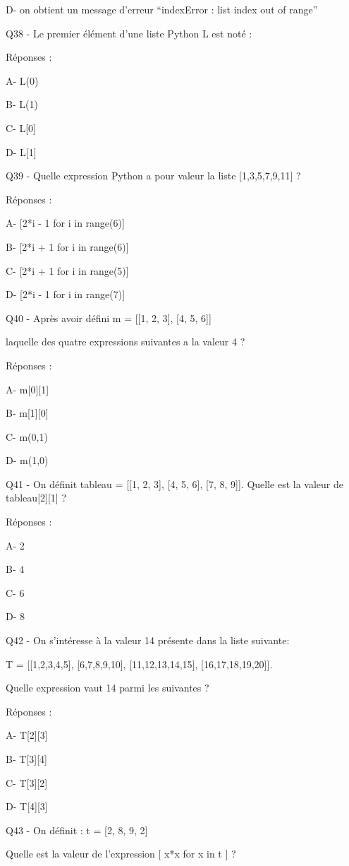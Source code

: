 \documentclass[
]{book}
\begin{document}
D- on obtient un message d'erreur ``indexError : list index out of range''

Q38 - Le premier élément d'une liste Python L est noté :

Réponses :

A- L(0)

B- L(1)

C- L{[}0{]}

D- L{[}1{]}

Q39 - Quelle expression Python a pour valeur la liste {[}1,3,5,7,9,11{]} ?

Réponses :

A- {[}2*i - 1 for i in range(6){]}

B- {[}2*i + 1 for i in range(6){]}

C- {[}2*i + 1 for i in range(5){]}

D- {[}2*i - 1 for i in range(7){]}

Q40 - Après avoir défini m = {[}{[}1, 2, 3{]}, {[}4, 5, 6{]}{]}

laquelle des quatre expressions suivantes a la valeur 4 ?

Réponses :

A- m{[}0{]}{[}1{]}

B- m{[}1{]}{[}0{]}

C- m(0,1)

D- m(1,0)

Q41 - On définit tableau = {[}{[}1, 2, 3{]}, {[}4, 5, 6{]}, {[}7, 8, 9{]}{]}. Quelle est la valeur de tableau{[}2{]}{[}1{]} ?

Réponses :

A- 2

B- 4

C- 6

D- 8

Q42 - On s'intéresse à la valeur 14 présente dans la liste suivante:

T = {[}{[}1,2,3,4,5{]}, {[}6,7,8,9,10{]}, {[}11,12,13,14,15{]}, {[}16,17,18,19,20{]}{]}.

Quelle expression vaut 14 parmi les suivantes ?

Réponses :

A- T{[}2{]}{[}3{]}

B- T{[}3{]}{[}4{]}

C- T{[}3{]}{[}2{]}

D- T{[}4{]}{[}3{]}

Q43 - On définit : t = {[}2, 8, 9, 2{]}

Quelle est la valeur de l'expression {[} x*x for x in t {]} ?
\end{document}
